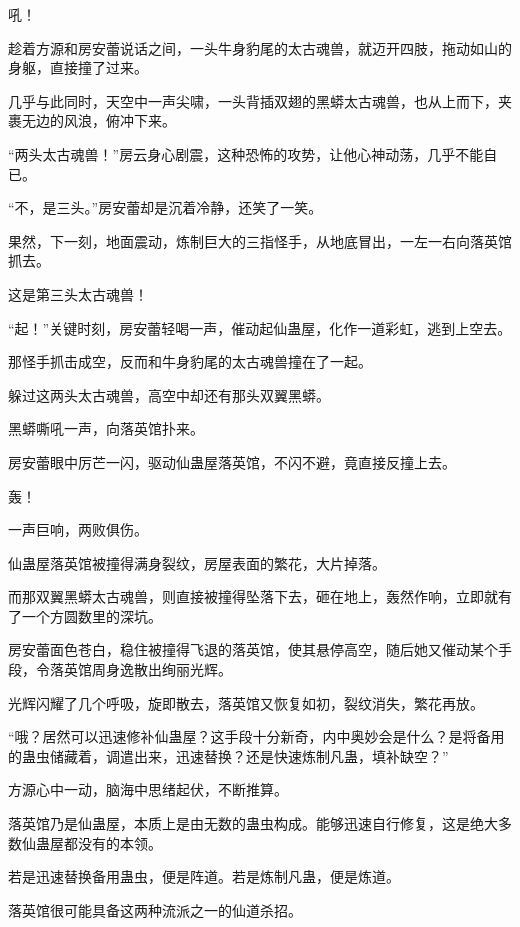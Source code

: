 
\begin{this_body}



吼！

趁着方源和房安蕾说话之间，一头牛身豹尾的太古魂兽，就迈开四肢，拖动如山的身躯，直接撞了过来。

几乎与此同时，天空中一声尖啸，一头背插双翅的黑蟒太古魂兽，也从上而下，夹裹无边的风浪，俯冲下来。

“两头太古魂兽！”房云身心剧震，这种恐怖的攻势，让他心神动荡，几乎不能自已。

“不，是三头。”房安蕾却是沉着冷静，还笑了一笑。

果然，下一刻，地面震动，炼制巨大的三指怪手，从地底冒出，一左一右向落英馆抓去。

这是第三头太古魂兽！

“起！”关键时刻，房安蕾轻喝一声，催动起仙蛊屋，化作一道彩虹，逃到上空去。

那怪手抓击成空，反而和牛身豹尾的太古魂兽撞在了一起。

躲过这两头太古魂兽，高空中却还有那头双翼黑蟒。

黑蟒嘶吼一声，向落英馆扑来。

房安蕾眼中厉芒一闪，驱动仙蛊屋落英馆，不闪不避，竟直接反撞上去。

轰！

一声巨响，两败俱伤。

仙蛊屋落英馆被撞得满身裂纹，房屋表面的繁花，大片掉落。

而那双翼黑蟒太古魂兽，则直接被撞得坠落下去，砸在地上，轰然作响，立即就有了一个方圆数里的深坑。

房安蕾面色苍白，稳住被撞得飞退的落英馆，使其悬停高空，随后她又催动某个手段，令落英馆周身逸散出绚丽光辉。

光辉闪耀了几个呼吸，旋即散去，落英馆又恢复如初，裂纹消失，繁花再放。

“哦？居然可以迅速修补仙蛊屋？这手段十分新奇，内中奥妙会是什么？是将备用的蛊虫储藏着，调遣出来，迅速替换？还是快速炼制凡蛊，填补缺空？”

方源心中一动，脑海中思绪起伏，不断推算。

落英馆乃是仙蛊屋，本质上是由无数的蛊虫构成。能够迅速自行修复，这是绝大多数仙蛊屋都没有的本领。

若是迅速替换备用蛊虫，便是阵道。若是炼制凡蛊，便是炼道。

落英馆很可能具备这两种流派之一的仙道杀招。


\end{this_body}
